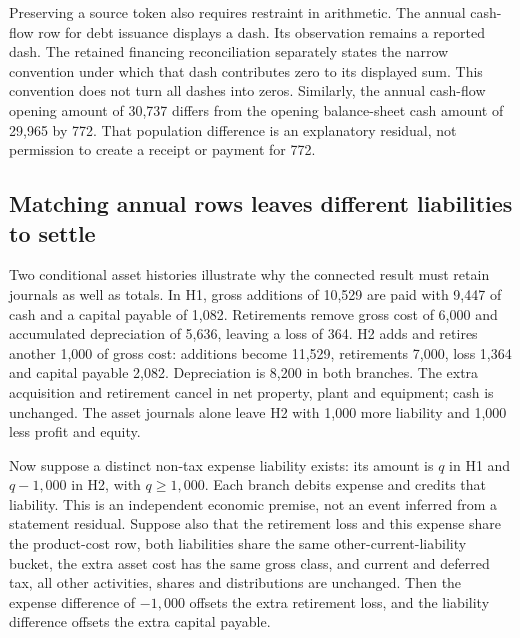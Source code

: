 Preserving a source token also requires restraint in arithmetic. The annual
cash-flow row for debt issuance displays a dash. Its observation remains a
reported dash. The retained financing reconciliation separately states the
narrow convention under which that dash contributes zero to its displayed
sum. This convention does not turn all dashes into zeros. Similarly, the
annual cash-flow opening amount of 30,737 differs from the opening balance-sheet
cash amount of 29,965 by 772. That population difference is an explanatory
residual, not permission to create a receipt or payment for 772.

\subsection{Matching annual rows leaves different liabilities to settle}

Two conditional asset histories illustrate why the connected result must
retain journals as well as totals. In H1, gross additions of 10,529 are paid
with 9,447 of cash and a capital payable of 1,082. Retirements remove gross
cost of 6,000 and accumulated depreciation of 5,636, leaving a loss of 364.
H2 adds and retires another 1,000 of gross cost: additions become 11,529,
retirements 7,000, loss 1,364 and capital payable 2,082. Depreciation is 8,200
in both branches. The extra acquisition and retirement cancel in net property,
plant and equipment; cash is unchanged. The asset journals alone leave H2
with 1,000 more liability and 1,000 less profit and equity.

Now suppose a distinct non-tax expense liability exists: its amount is $q$
in H1 and $q-1{,}000$ in H2, with $q\geq1{,}000$. Each branch debits expense
and credits that liability. This is an independent economic premise, not an
event inferred from a statement residual. Suppose also that the retirement
loss and this expense share the product-cost row, both liabilities share the
same other-current-liability bucket, the extra asset cost has the same gross
class, and current and deferred tax, all other activities, shares and
distributions are unchanged. Then the expense difference of $-1{,}000$
offsets the extra retirement loss, and the liability difference offsets the
extra capital payable.

